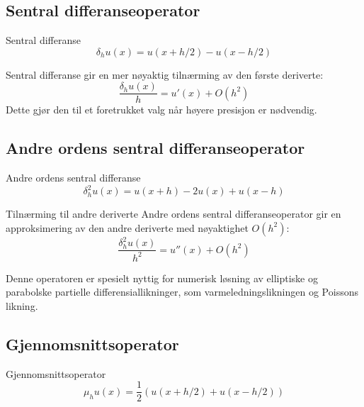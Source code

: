 \subsection{Sentral differanseoperator}
\begin{definition}{Sentral differanse}{}
  \begin{equation}
    \delta_h u(x) = u(x + h/2) - u(x - h/2) \label{eq:central_diff}
  \end{equation}
\end{definition}

\begin{remark*}{}{}
  Sentral differanse gir en mer nøyaktig tilnærming av den første deriverte:
  \begin{equation}
    \frac{\delta_h u(x)}{h} = u'(x) + O(h^2)
  \end{equation}
  Dette gjør den til et foretrukket valg når høyere presisjon er nødvendig.
\end{remark*}

\subsection{Andre ordens sentral differanseoperator}
\begin{definition}{Andre ordens sentral differanse}{}
  \begin{equation}
    \delta_h^2 u(x) = u(x + h) - 2u(x) + u(x - h) \label{eq:second_central_diff}
  \end{equation}
\end{definition}

\begin{proposition}{Tilnærming til andre deriverte}{}
  Andre ordens sentral differanseoperator gir en approksimering av den andre deriverte med nøyaktighet $O(h^2)$:
  \begin{equation}
    \frac{\delta_h^2 u(x)}{h^2} = u''(x) + O(h^2)
  \end{equation}
\end{proposition}

\begin{remark*}{}{}
  Denne operatoren er spesielt nyttig for numerisk løsning av elliptiske og parabolske partielle differensiallikninger, som varmeledningslikningen og Poissons likning.
\end{remark*}

\subsection{Gjennomsnittsoperator}
\begin{definition}{Gjennomsnittsoperator}{}
  \begin{equation}
    \mu_h u(x) = \frac{1}{2} \left( u(x + h/2) + u(x - h/2) \right) \label{eq:avg_op}
  \end{equation}
\end{definition}

